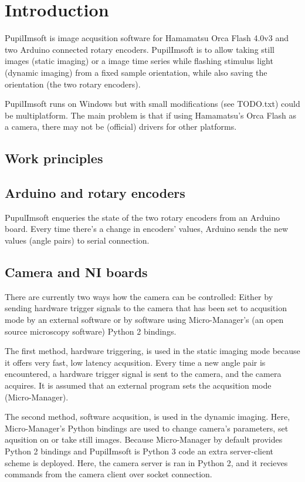 \documentclass{article}
\begin{document}
\section{Introduction}

PupilImsoft is image acqusition software for Hamamatsu Orca Flash 4.0v3 and two Arduino connected rotary encoders.
PupilImsoft is to allow taking still images (static imaging) or a image time series while flashing stimulus light (dynamic imaging)
from a fixed sample orientation, while also saving the orientation (the two rotary encoders).

PupilImsoft runs on Windows but with small modifications (see TODO.txt) could be multiplatform.
The main problem is that if using Hamamatsu's Orca Flash as a camera, there may not be (official) drivers for other platforms.

\subsection{Work principles}

\subsection{Arduino and rotary encoders}
PupulImsoft enqueries the state of the two rotary encoders from an Arduino board.
Every time there's a change in encoders' values, Arduino sends the new values (angle pairs) to serial connection.


\subsection{Camera and NI boards}
There are currently two ways how the camera can be controlled:
Either by sending hardware trigger signals to the camera that has been set to acqusition mode by an external software
or by software using Micro-Manager's (an open source microscopy software) Python 2 bindings.

The first method, hardware triggering, is used in the static imaging mode because it offers very fast, low latency acqusition.
Every time a new angle pair is encountered, a hardware trigger signal is sent to the camera, and the camera acquires.
It is assumed that an external program sets the acqusition mode (Micro-Manager).


The second method, software acqusition, is used in the dynamic imaging.
Here, Micro-Manager's Python bindings are used to change camera's parameters, set aqusition on or take still images.
Because Micro-Manager by default provides Python 2 bindings and PupilImsoft is Python 3 code an extra server-client scheme is deployed.
Here, the camera server is ran in Python 2, and it recieves commands from the camera client over socket connection.
\end{document}
